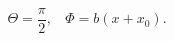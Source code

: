\begin{equation}                                        \label{esedeg}
  \Theta=\frac\pi2,~~~~\Phi=b(x+x_0).
\end{equation}

